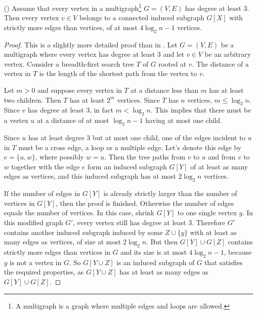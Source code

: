 \begin{lemma}\label{lem:BermanMIS1}
(\cite[Lemma 3.1]{BermanMIS}) Assume that every vertex in a multigraph\footnote{A multigraph is a graph where multiple edges and loops are allowed.} $G = (V,E)$ has degree at least 3. Then every vertex $v \in V$ belongs to a connected induced subgraph $G[X]$ with strictly more edges than vertices, of at most $4 \log_2 n - 1$ vertices.
\end{lemma}
%
\begin{proof}
This is a slightly more detailed proof than in \cite{BermanMIS}. Let $G = (V,E)$ be a multigraph where every vertex has degree at least 3 and let $v \in V$ be an arbitrary vertex. Consider a breadth-first search tree $T$ of $G$ rooted at $v$. The distance of a vertex in $T$ is the length of the shortest path from the vertex to $v$.

Let $m > 0$ and suppose every vertex in $T$ at a distance less than $m$ has at least two children. Then $T$ has at least $2^m$ vertices. Since $T$ has $n$ vertices, $m \leq \log_2 n$. Since $v$ has degree at least 3, in fact $m < \log_2 n$. This implies that there must be a vertex $u$ at a distance of at most $\log_2 n - 1$ having at most one child.

Since $u$ has at least degree 3 but at most one child, one of the edges incident to $u$ in $T$ must be a cross edge, a loop or a multiple edge. Let's denote this edge by $e = \{u,w\}$, where possibly $w = u$. Then the tree paths from $v$ to $u$ and from $v$ to $w$ together with the edge $e$ form an induced subgraph $G[Y]$ of at least as many edges as vertices, and this induced subgraph has at most $2 \log_2 n$ vertices.

If the number of edges in $G[Y]$ is already strictly larger than the number of vertices in $G[Y]$, then the proof is finished. Otherwise the number of edges equals the number of vertices. In this case, shrink $G[Y]$ to one single vertex $y$. In this modified graph $G'$, every vertex still has degree at least 3. Therefore $G'$ contains another induced subgraph induced by some $Z\cup\{y\}$ with at least as many edges as vertices, of size at most $2 \log_2 n$. But then $G[Y] \cup G[Z]$ contains strictly more edges than vertices in $G$ and its size is at most $4 \log_2 n - 1$, because $y$ is not a vertex in $G$. So $G[Y \cup Z]$ is an induced subgraph of $G$ that satisfies the required properties, as $G[Y \cup Z]$ has at least as many edges as $G[Y] \cup G[Z]$. %
\end{proof}

